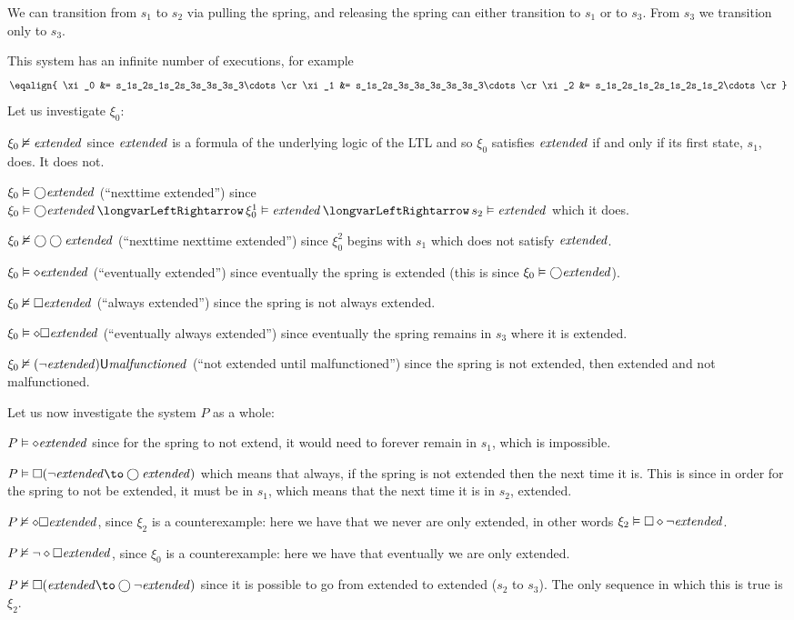     We can transition from $s_1$ to $s_2$ via pulling the spring, and releasing the spring can either transition to $s_1$ or to $s_3$.
    From $s_3$ we transition only to $s_3$.

    This system has an infinite number of executions, for example
    $$ \eqalign{
        \xi_0 &= s_1s_2s_1s_2s_3s_3s_3s_3\cdots\cr
        \xi_1 &= s_1s_2s_3s_3s_3s_3s_3s_3\cdots\cr
        \xi_2 &= s_1s_2s_1s_2s_1s_2s_1s_2\cdots\cr
    } $$
    Let us investigate $\xi_0$:
    \benum
        \item $\xi_0\nvDash{\it extended}$ since ${\it extended}$ is a formula of the underlying logic of the LTL and so $\xi_0$ satisfies ${\it extended}$ if and only if its first state, $s_1$, does.
            It does not.
        \item $\xi_0\vDash\bigcirc{\it extended}$ (``nexttime extended'') since $\xi_0\vDash\bigcirc\ext\iff\xi_0^1\vDash\ext\iff s_2\vDash\ext$ which it does.
        \item $\xi_0\nvDash\bigcirc\bigcirc{\it extended}$ (``nexttime nexttime extended'') since $\xi_0^2$ begins with $s_1$ which does not satisfy ${\it extended}$.
        \item $\xi_0\vDash\diamond{\it extended}$ (``eventually extended'') since eventually the spring is extended (this is since $\xi_0\vDash\bigcirc{\it extended}$).
        \item $\xi_0\nvDash\square{\it extended}$ (``always extended'') since the spring is not always extended.
        \item $\xi_0\vDash\diamond\square{\it extended}$ (``eventually always extended'') since eventually the spring remains in $s_3$ where it is extended.
        \item $\xi_0\nvDash(\neg{\it extended}){\sf U}{\it malfunctioned}$ (``not extended until malfunctioned'') since the spring is not extended, then extended and not malfunctioned.
    \eenum

    Let us now investigate the system $P$ as a whole:
    \benum
        \item $P\vDash\diamond{\it extended}$ since for the spring to not extend, it would need to forever remain in $s_1$, which is impossible.
        \item $P\vDash\square(\neg\ext\to\bigcirc\ext)$ which means that always, if the spring is not extended then the next time it is.
            This is since in order for the spring to not be extended, it must be in $s_1$, which means that the next time it is in $s_2$, extended.
        \item $P\nvDash\diamond\square{\it extended}$, since $\xi_2$ is a counterexample: here we have that we never are only extended, in other words $\xi_2\vDash\square\diamond\neg{\it extended}$.
        \item $P\nvDash\neg\diamond\square{\it extended}$, since $\xi_0$ is a counterexample: here we have that eventually we are only extended.
        \item $P\nvDash\square(\ext\to\bigcirc\neg\ext)$ since it is possible to go from extended to extended ($s_2$ to $s_3$).
            The only sequence in which this is true is $\xi_2$.
    \eenum

